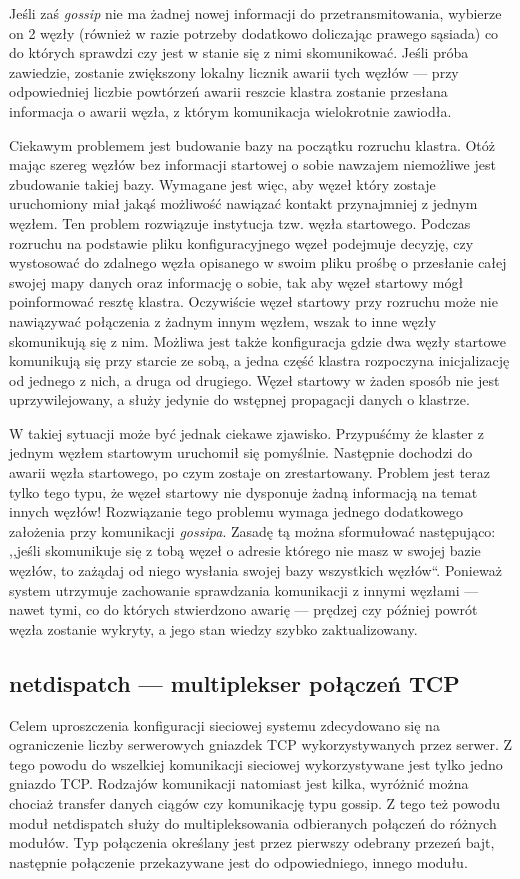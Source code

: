 \documentclass[a4paper,polish,12pt,twoside]{article}
\begin{document}
	Jeśli zaś \textit{gossip} nie ma żadnej nowej informacji do przetransmitowania, wybierze on 2 węzły (również w razie potrzeby dodatkowo doliczając prawego sąsiada) co do których sprawdzi czy jest w stanie się z nimi skomunikować. Jeśli próba zawiedzie, zostanie zwiększony lokalny licznik awarii tych węzłów --- przy odpowiedniej liczbie powtórzeń awarii reszcie klastra zostanie przesłana informacja o awarii węzła, z którym komunikacja wielokrotnie zawiodła.

	Ciekawym problemem jest budowanie bazy na początku rozruchu klastra. Otóż mając szereg węzłów bez informacji startowej o sobie nawzajem niemożliwe jest zbudowanie takiej bazy. Wymagane jest więc, aby węzeł który zostaje uruchomiony miał jakąś możliwość nawiązać kontakt przynajmniej z jednym węzłem. Ten problem rozwiązuje instytucja tzw. węzła startowego. Podczas rozruchu na podstawie pliku konfiguracyjnego węzeł podejmuje decyzję, czy wystosować do zdalnego węzła opisanego w swoim pliku prośbę o przesłanie całej swojej mapy danych oraz informację o sobie, tak aby węzeł startowy mógł poinformować resztę klastra. Oczywiście węzeł startowy przy rozruchu może nie nawiązywać połączenia z żadnym innym węzłem, wszak to inne węzły skomunikują się z nim. Możliwa jest także konfiguracja gdzie dwa węzły startowe komunikują się przy starcie ze sobą, a jedna część klastra rozpoczyna inicjalizację od jednego z nich, a druga od drugiego. Węzeł startowy w żaden sposób nie jest uprzywilejowany, a służy jedynie do wstępnej propagacji danych o klastrze.

W takiej sytuacji może być jednak ciekawe zjawisko. Przypuśćmy że klaster z jednym węzłem startowym uruchomił się pomyślnie. Następnie dochodzi do awarii węzła startowego, po czym zostaje on zrestartowany. Problem jest teraz tylko tego typu, że węzeł startowy nie dysponuje żadną informacją na temat innych węzłów! Rozwiązanie tego problemu wymaga jednego dodatkowego założenia przy komunikacji \textit{gossipa}. Zasadę tą można sformułować następująco: ,,jeśli skomunikuje się z tobą węzeł o adresie którego nie masz w swojej bazie węzłów, to zażądaj od niego wysłania swojej bazy wszystkich węzłów``. Ponieważ system utrzymuje zachowanie sprawdzania komunikacji z innymi węzłami --- nawet tymi, co do których stwierdzono awarię --- prędzej czy później powrót węzła zostanie wykryty, a jego stan wiedzy szybko zaktualizowany.

	\subsection{netdispatch --- multiplekser połączeń TCP}
Celem uproszczenia konfiguracji sieciowej systemu zdecydowano się na ograniczenie liczby serwerowych gniazdek TCP wykorzystywanych przez serwer. Z tego powodu do wszelkiej komunikacji sieciowej wykorzystywane jest tylko jedno gniazdo TCP. Rodzajów komunikacji natomiast jest kilka, wyróżnić można chociaż transfer danych ciągów czy komunikację typu gossip. Z tego też powodu moduł netdispatch służy do multipleksowania odbieranych połączeń do różnych modułów. Typ połączenia określany jest przez pierwszy odebrany przezeń bajt, następnie połączenie przekazywane jest do odpowiedniego, innego modułu.
\end{document}
